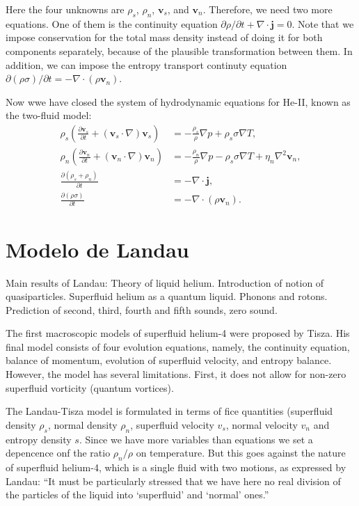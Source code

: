 \documentclass{article}
\begin{document}
Here the four unknowns are $\rho_s$, $\rho_n$, $\mathbf{v}_s$, and $\mathbf{v}_n$. Therefore, we need two more equations. One of them is the continuity equation $\partial \rho / \partial t + \nabla \cdot \mathbf{j} = 0$. Note that we impose conservation for the total mass density instead of doing it for both components separately, because of the plausible transformation between them. In addition, we can impose the entropy transport continuty equation $\partial (\rho \sigma) / \partial t = - \nabla \cdot (\rho \mathbf{v}_n)$.

Now wwe have closed the system of hydrodynamic equations for He-II, known as the two-fluid model:
\begin{align}
\rho_s \left( \frac{\partial \mathbf{v}_s}{\partial t} + (\mathbf{v}_s \cdot \nabla) \mathbf{v}_s \right) &= -\frac{\rho_s}{\rho} \nabla p + \rho_s \sigma \nabla T,  \\
\rho_n \left( \frac{\partial \mathbf{v}_n}{\partial t} + (\mathbf{v}_n \cdot \nabla) \mathbf{v}_n \right) &= -\frac{\rho_n}{\rho} \nabla p - \rho_s \sigma \nabla T + \eta_n \nabla^2 \mathbf{v}_n,  \\
\frac{\partial (\rho_s + \rho_n)}{\partial t} &= -\nabla \cdot \mathbf{j}, \\
\frac{\partial (\rho \sigma)}{\partial t} &= -\nabla \cdot (\rho \mathbf{v}_n). 
\end{align}


\section{Modelo de Landau}
\cite{Kincl}
Main results of Landau:
Theory of liquid helium. Introduction of notion of quasiparticles. Superfluid
helium as a quantum liquid. Phonons and rotons. Prediction of second, third,
fourth and fifth sounds, zero sound.

\cite{PhysRev.60.356}

The first macroscopic models of superfluid helium-4 were
proposed by Tisza. His final model consists of four evolution equations, namely, the continuity equation, balance of momentum, evolution of superfluid velocity, and entropy balance. However, the model has several limitations. First, it does not allow for non-zero superfluid vorticity (quantum vortices). 

The Landau-Tisza model is formulated in terms of fice quantities (superfluid density $\rho_s$, normal density $\rho_n$, superfluid velocity $v_s$, normal velocity $v_n$ and entropy density $s$. Since we have more variables than equations we set a depencence onf the ratio $\rho_n/\rho$ on temperature. But this goes against the nature of superfluid helium-4, which is a single fluid with two motions, as expressed by Landau: “It must be particularly stressed that we
have here no real division of the particles of the liquid into ‘superfluid’
and ‘normal’ ones.”
\end{document}
